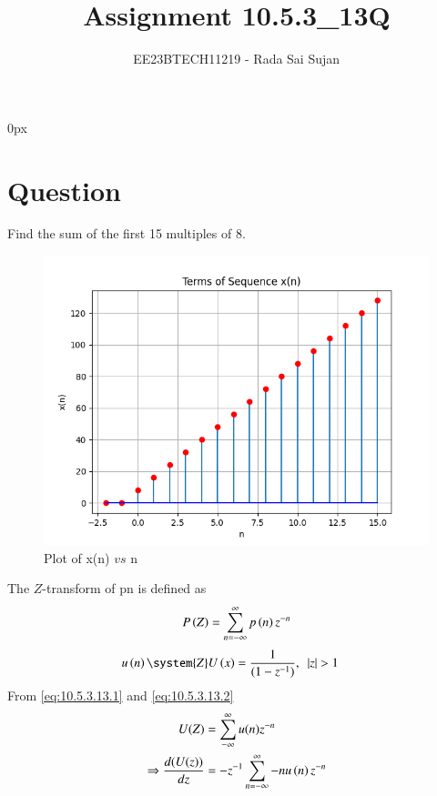\documentclass[journal,12pt,twocolumn]{IEEEtran}
\theoremstyle{remark}
\begin{document}
\parindent 0px

\title{Assignment 10.5.3\_13Q}
\author{EE23BTECH11219 - Rada Sai Sujan$^{}$%
}
\maketitle
\newpage
\bigskip
\section*{Question}
Find the sum of the first 15 multiples of 8. \\
\solution

    \begin{figure}[ht]
        \centering
        \includegraphics[width=\columnwidth]{figs/a.png}
        \caption{Plot of x(n) $vs$ n}
        \label{fig:10.5.3.13.1}
    \end{figure}
The $Z$-transform of p\brak n is defined as 
\begin{align}
    P\left(Z\right)=\sum\limits_{n=-\infty}^{\infty}p\left(n\right)z^{-n}         \label{eq:10.5.3.13.1}
\end{align}
\begin{align}
    u\brak{n} \system{Z} U\brak{x}&=\dfrac{1}{(1-{z}^{-1})}, \,\,\,|z|>1 \label{eq:10.5.3.13.2}
\end{align}
From \eqref{eq:10.5.3.13.1} and \eqref{eq:10.5.3.13.2}
\begin{align}
    U(Z)&=\sum\limits_{-\infty}^{\infty}u(n)z^{-n}   \\
    \Rightarrow \dfrac{d(U(z))}{dz} &= -z^{-1}\sum\limits_{n=-\infty}^{\infty}-nu\left(n\right)z^{-n}   
\end{align}
\end{document}
